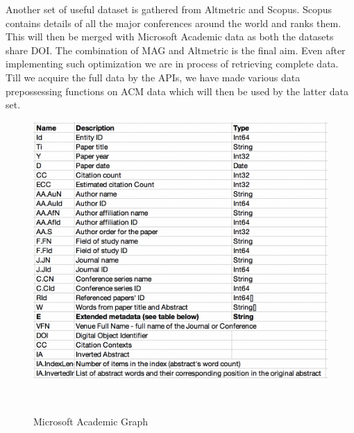 \documentclass[a4paper, 11pt]{article}
\begin{document}
Another set of useful dataset is gathered from Altmetric and Scopus. Scopus
contains details of all the major conferences around the world and ranks them. This will then be merged with Microsoft Academic data as both the datasets share DOI. The combination of MAG and Altmetric is the final aim. Even after implementing such optimization  we are in process of retrieving complete data. Till we acquire the full data by the APIs, we have made various data prepossessing functions on ACM data which will then be used by the latter data set. 
\begin{figure}[ht]
\centering
  \includegraphics[width=0.7\columnwidth]{MAG_data-info.png}
  \caption{Microsoft Academic Graph}~\label{fig: Microsoft Academic Graph}
\end{figure}
\FloatBarrier
\end{document}

